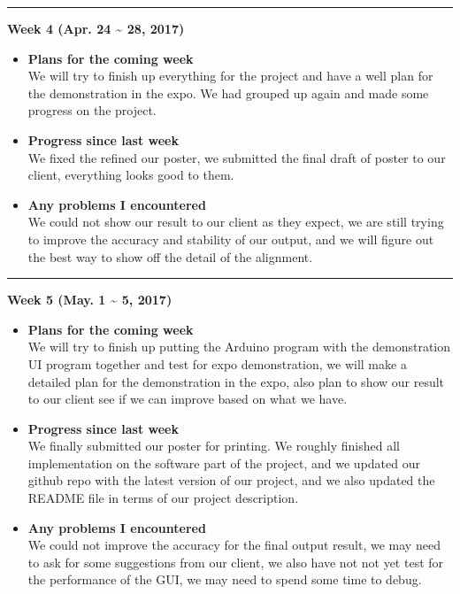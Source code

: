 	\rule{\textwidth}{0.5pt}

	\begin{center}
		\textbf{Week 4 (Apr. 24 {\textasciitilde{}} 28, 2017)}
	\end{center}
	\begin{itemize}
		\item \textbf{Plans for the coming week}
		\\We will try to finish up everything for the project and have a well plan for the demonstration in the expo. We had grouped up again and made some progress on the project.\\

		\item \textbf{Progress since last week}
		\\We fixed the refined our poster, we submitted the final draft of poster to our client, everything looks good to them.\\

		\item \textbf{Any problems I encountered}
		\\We could not show our result to our client as they expect, we are still trying to improve the accuracy and stability of our output, and we will figure out the best way to show off the detail of the alignment.\\
	\end{itemize}

	\rule{\textwidth}{0.5pt}

	\begin{center}
		\textbf{Week 5 (May. 1 {\textasciitilde{}} 5, 2017)}
	\end{center}
	\begin{itemize}
		\item \textbf{Plans for the coming week}
		\\We will try to finish up putting the Arduino program with the demonstration UI program together and test for expo demonstration, we will make a detailed plan for the demonstration in the expo, also plan to show our result to our client see if we can improve based on what we have.\\

		\item \textbf{Progress since last week}
		\\We finally submitted our poster for printing. We roughly finished all implementation on the software part of the project, and we updated our github repo with the latest version of our project, and we also updated the README file in terms of our project description.\\

		\item \textbf{Any problems I encountered}
		\\We could not improve the accuracy for the final output result, we may need to ask for some suggestions from our client, we also have not not yet test for the performance of the GUI, we may need to spend some time to debug.\\
	\end{itemize}

